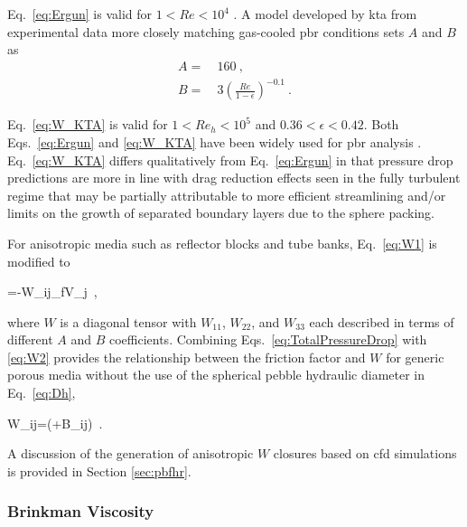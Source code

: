 \noindent Eq.\ \eqref{eq:Ergun} is valid for \(1<Re<10^4\) \cite{eisfeld,nield,ergun,avigni}. A model developed by \gls{kta} from experimental data more closely matching gas-cooled \gls{pbr} conditions sets \(A\) and \(B\) as \cite{KTA}
\begin{subequations}
\label{eq:W_KTA}
\begin{align}
A=&\ 160\ ,\\
B=&\ 3\left(\frac{Re}{1-\epsilon}\right)^{-0.1}\ .
\end{align}
\end{subequations}

\noindent Eq.\ \eqref{eq:W_KTA} is valid for \(1<Re_h<10^5\) and \(0.36<\epsilon<0.42\). Both Eqs.\ \eqref{eq:Ergun} and \eqref{eq:W_KTA} have been widely used for \gls{pbr} analysis \cite{gao, becker, becker2003, auwerda_2011,kececioglu,avigni,suikkanen,ge,scarlat,y_li,cai}. Eq.\ \eqref{eq:W_KTA} differs qualitatively from Eq.\ \eqref{eq:Ergun} in that pressure drop predictions are more in line with drag reduction effects seen in the fully turbulent regime \cite{fand,kececioglu,KTA,barree,nield_2000} that may be partially attributable to more efficient streamlining and/or limits on the growth of separated boundary layers due to the sphere packing.

For anisotropic media such as reflector blocks and tube banks, Eq.\ \eqref{eq:W1} is modified to

\beq
\label{eq:W2}
\epsilon{}=-W_{ij}\rho_fV_j\ ,
\eeq

\noindent where \(W\) is a diagonal tensor with \(W_{11}\), \(W_{22}\), and \(W_{33}\) each described in terms of different \(A\) and \(B\) coefficients. Combining Eqs.\ \eqref{eq:TotalPressureDrop} with \eqref{eq:W2} provides the relationship between the friction factor and \(W\) for generic porous media without the use of the spherical pebble hydraulic diameter in Eq.\ \eqref{eq:Dh},

\beq
\label{eq:W3}
W_{ij}=\left(+B_{ij}\right)\ .
\eeq

\noindent A discussion of the generation of anisotropic \(W\) closures based on \gls{cfd} simulations is provided in Section \ref{sec:pbfhr}. 

\subsubsection{Brinkman Viscosity}
\label{sec:BrinkmanMu}


